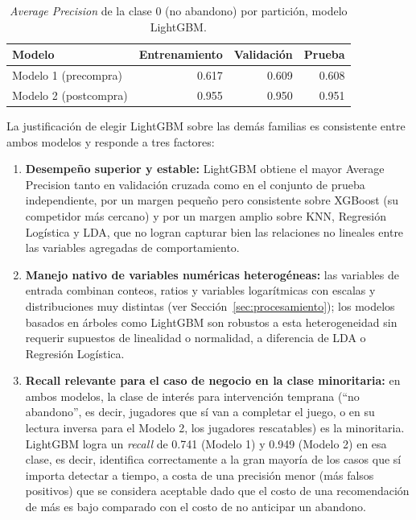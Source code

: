 \documentclass[11pt,letterpaper]{article}
\begin{document}
\begin{table}[h!]
\centering
\small
\caption{\textit{Average Precision} de la clase 0 (no abandono) por partición, modelo LightGBM.}
\label{tab:ap0}
\begin{tabular}{@{}lrrr@{}}
\toprule
Modelo & Entrenamiento & Validación & Prueba \\
\midrule
Modelo 1 (precompra)  & 0.617 & 0.609 & 0.608 \\
Modelo 2 (postcompra) & 0.955 & 0.950 & 0.951 \\
\bottomrule
\end{tabular}
\end{table}

La justificación de elegir LightGBM sobre las demás familias es consistente entre ambos modelos y responde a tres factores:

\begin{enumerate}
  \item \textbf{Desempeño superior y estable:} LightGBM obtiene el mayor Average Precision tanto en validación cruzada como en el conjunto de prueba independiente, por un margen pequeño pero consistente sobre XGBoost (su competidor más cercano) y por un margen amplio sobre KNN, Regresión Logística y LDA, que no logran capturar bien las relaciones no lineales entre las variables agregadas de comportamiento.
  \item \textbf{Manejo nativo de variables numéricas heterogéneas:} las variables de entrada combinan conteos, ratios y variables logarítmicas con escalas y distribuciones muy distintas (ver Sección~\ref{sec:procesamiento}); los modelos basados en árboles como LightGBM son robustos a esta heterogeneidad sin requerir supuestos de linealidad o normalidad, a diferencia de LDA o Regresión Logística.
  \item \textbf{Recall relevante para el caso de negocio en la clase minoritaria:} en ambos modelos, la clase de interés para intervención temprana (``no abandono'', es decir, jugadores que sí van a completar el juego, o en su lectura inversa para el Modelo 2, los jugadores rescatables) es la minoritaria. LightGBM logra un \textit{recall} de 0.741 (Modelo 1) y 0.949 (Modelo 2) en esa clase, es decir, identifica correctamente a la gran mayoría de los casos que sí importa detectar a tiempo, a costa de una precisión menor (más falsos positivos) que se considera aceptable dado que el costo de una recomendación de más es bajo comparado con el costo de no anticipar un abandono.
\end{enumerate}
\end{document}
